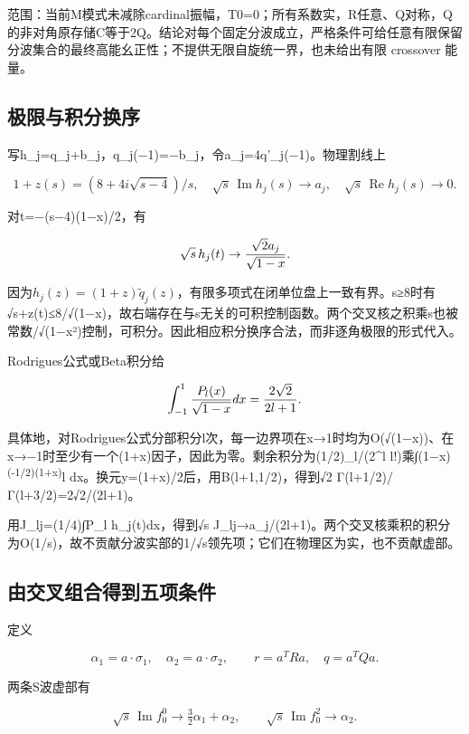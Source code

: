 \documentclass[
  10pt,
  a4paper,
]{article}
\begin{document}
范围：当前M模式未减除cardinal振幅，T0=0；所有系数实，R任意、Q对称，Q的非对角原存储C等于2Q。结论对每个固定分波成立，严格条件可给任意有限保留分波集合的最终高能幺正性；不提供无限自旋统一界，也未给出有限
crossover 能量。

\subsection{极限与积分换序}\label{ux6781ux9650ux4e0eux79efux5206ux6362ux5e8f}

写h\_j=q\_j+b\_j，q\_j(−1)=−b\_j，令a\_j=4q'\_j(−1)。物理割线上

\[
1+z(s)=(8+4i\sqrt{s-4})/s,
\quad\sqrt{s}\,\operatorname{Im}h_j(s)\to a_j,
\quad\sqrt{s}\,\operatorname{Re}h_j(s)\to0.
\]

对t=−(s−4)(1−x)/2，有

\[
\sqrt{s}\,h_j(t)\to {\sqrt2 a_j\over\sqrt{1-x}}.
\]

因为\(h_j(z)=(1+z)\widetilde q_j(z)\)，有限多项式在闭单位盘上一致有界。s≥8时有√s+z(t)\textbar≤8/√(1−x)，故右端存在与s无关的可积控制函数。两个交叉核之积乘s也被常数/√(1−x²)控制，可积分。因此相应积分换序合法，而非逐角极限的形式代入。

Rodrigues公式或Beta积分给

\[
\int_{-1}^{1}{P_l(x)\over\sqrt{1-x}}dx={2\sqrt2\over2l+1}.
\]

具体地，对Rodrigues公式分部积分l次，每一边界项在x→1时均为O(√(1−x))、在x→−1时至少有一个(1+x)因子，因此为零。剩余积分为(1/2)\_l/(2\^{}l
l!)乘∫(1−x)\textsuperscript{(-1/2)(1+x)}l
dx。换元y=(1+x)/2后，用B(l+1,1/2)，得到√2 Γ(l+1/2)/Γ(l+3/2)=2√2/(2l+1)。

用J\_lj=(1/4)∫P\_l h\_j(t)dx，得到√s
J\_lj→a\_j/(2l+1)。两个交叉核乘积的积分为O(1/s)，故不贡献分波实部的1/√s领先项；它们在物理区为实，也不贡献虚部。

\subsection{由交叉组合得到五项条件}\label{ux7531ux4ea4ux53c9ux7ec4ux5408ux5f97ux5230ux4e94ux9879ux6761ux4ef6}

定义

\[
\alpha_1=a\cdot\sigma_1,\quad\alpha_2=a\cdot\sigma_2,
\qquad r=a^TRa,\quad q=a^TQa.
\]

两条S波虚部有

\[
\sqrt{s}\,\operatorname{Im}f_0^0\to\tfrac32\alpha_1+\alpha_2,
\qquad\sqrt{s}\,\operatorname{Im}f_0^2\to\alpha_2.
\]
\end{document}
